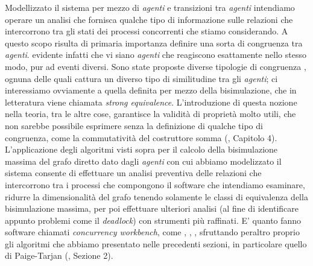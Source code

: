 Modellizzato il sistema per mezzo di \emph{agenti} e transizioni tra \emph{agenti} intendiamo operare un analisi che fornisca qualche tipo di informazione sulle relazioni che intercorrono tra gli stati dei processi concorrenti che stiamo considerando. A questo scopo risulta di primaria importanza definire una sorta di congruenza tra \emph{agenti}. \accente evidente infatti che vi siano \emph{agenti} che reagiscono esattamente nello stesso modo, pur ad eventi diversi. Sono state proposte diverse tipologie di congruenza \cite{kanellakis}, ognuna delle quali cattura un diverso tipo di similitudine tra gli \emph{agenti}; ci interessiamo ovviamente a quella definita per mezzo della bisimulazione, che in letteratura viene chiamata \emph{strong equivalence}. L'introduzione di questa nozione nella teoria, tra le altre cose, garantisce la validità di proprietà molto utili, che non sarebbe possibile esprimere senza la definizione di qualche tipo di congruenza, come la commutatività del costruttore somma (\cite{intro_calculus}, Capitolo 4). L'applicazione degli algoritmi visti sopra per il calcolo della bisimulazione massima del grafo diretto dato dagli \emph{agenti} con cui abbiamo modelizzato il sistema consente di effettuare un analisi preventiva delle relazioni che intercorrono tra i processi che compongono il software che intendiamo esaminare, ridurre la dimensionalità del grafo tenendo solamente le classi di equivalenza della bisimulazione massima, per poi effettuare ulteriori analisi (al fine di identificare appunto problemi come il \emph{deadlock}) con strumenti più raffinati. E' quanto fanno software chiamati \emph{concurrency workbench}, come \cite{ncsu}, \cite{caal}, \cite{cwnc}, sfruttando peraltro proprio gli algoritmi che abbiamo presentato nelle precedenti sezioni, in particolare quello di Paige-Tarjan (\cite{dovier}, Sezione 2).
